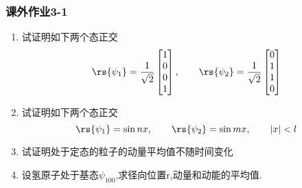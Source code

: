\begin{frame}
    \frametitle{课外作业3-1}
    \begin{enumerate}
        \item 试证明如下两个态正交
        \[\rs{\psi_1}=\frac{1}{\sqrt{2}}
        \begin{bmatrix}
            1 \\ 
            0 \\  
            0 \\ 
            1 
        \end{bmatrix}, \qquad  \rs{\psi_2}=\frac{1}{\sqrt{2}}
        \begin{bmatrix}
            0 \\ 
            1 \\  
            1 \\ 
            0 
        \end{bmatrix} \]
        \item 试证明如下两个态正交
        \[ \rs{\psi_1}=\sin nx,\qquad \rs{\psi_2}=\sin mx,\qquad  \left|x\right|<l      
        \]
        \item 试证明处于定态的粒子的动量平均值不随时间变化
        \item 设氢原子处于基态$\psi_{100}$,求径向位置r,动量和动能的平均值. 
    \end{enumerate}
    
\end{frame}

